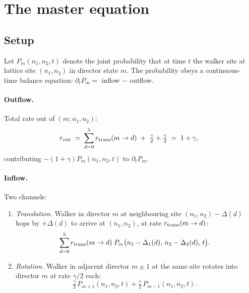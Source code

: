 \documentclass[11pt,a4paper]{article}
\begin{document}
\section{The master equation}\label{sec:master}

\subsection{Setup}\label{ssec:master-setup}

Let $P_m(n_1, n_2, t)$ denote the joint probability that at time $t$ the
walker sits at lattice site $(n_1, n_2)$ in director state $m$. The
probability obeys a continuous-time balance equation:
$\partial_t P_m = $ inflow $-$ outflow.

\paragraph{Outflow.} Total rate out of $(m; n_1, n_2)$:
\begin{equation}\label{eq:outflow}
r_{\rm out} \;=\; \sum_{d=0}^{5} r_{\rm trans}(m \to d) \;+\; \tfrac{\gamma}{2} + \tfrac{\gamma}{2} \;=\; 1 + \gamma,
\end{equation}
contributing $-(1+\gamma)P_m(n_1, n_2, t)$ to $\partial_t P_m$.

\paragraph{Inflow.} Two channels:
\begin{enumerate}[leftmargin=*,nosep]
\item \emph{Translation.} Walker in director $m$ at neighbouring site
  $(n_1, n_2) - \Delta(d)$ hops by $+\Delta(d)$ to arrive at
  $(n_1, n_2)$, at rate $r_{\rm trans}(m \to d)$:
  \begin{equation}\label{eq:inflow_trans}
  \sum_{d=0}^{5} r_{\rm trans}(m \to d)\; P_m\big(n_1 - \Delta_1(d),\, n_2 - \Delta_2(d),\, t\big).
  \end{equation}
\item \emph{Rotation.} Walker in adjacent director $m \pm 1$ at the same
  site rotates into director $m$ at rate $\gamma/2$ each:
  \begin{equation}\label{eq:inflow_rot}
  \tfrac{\gamma}{2}\, P_{m+1}(n_1, n_2, t) + \tfrac{\gamma}{2}\, P_{m-1}(n_1, n_2, t).
  \end{equation}
\end{enumerate}
\end{document}
